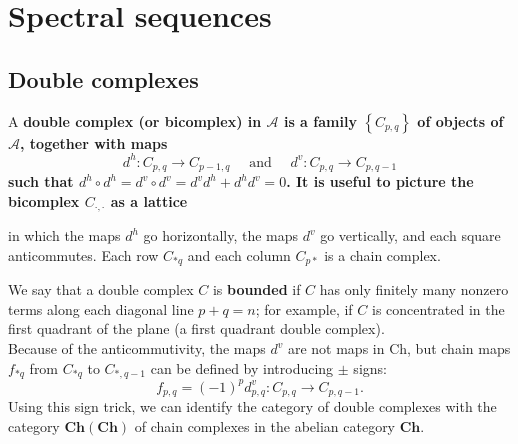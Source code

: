 \section{Spectral sequences}

\subsection{Double complexes}
A \bf{double complex} (or bicomplex) in $\mathcal{A}$ is a family $\left\{C_{p, q}\right\}$ of objects of $\mathcal{A}$, together with maps
$$
d^h: C_{p, q} \rightarrow C_{p-1, q} \quad \text { and } \quad d^v: C_{p, q} \rightarrow C_{p, q-1}
$$
such that $d^h \circ d^h=d^v \circ d^v=d^v d^h+d^h d^v=0$. It is useful to picture the bicomplex $C_{\cdot,\cdot}$ as a lattice 
\begin{center}
\end{center}
    in which the maps $d^h$ go horizontally, the maps $d^v$ go vertically, and each square anticommutes. Each row $C_{* q}$ and each column $C_{p *}$ is a chain complex.

We say that a double complex $C$ is \textbf{bounded} if $C$ has only finitely many nonzero terms along each diagonal line $p+q=n$; for example, if $C$ is concentrated in the first quadrant of the plane (a first quadrant double complex).\\
Because of the anticommutivity, the maps $d^v$ are not maps in Ch, but chain maps $f_{* q}$ from $C_{* q}$ to $C_{*, q-1}$ can be defined by introducing $\pm$ signs:
$$
f_{p, q}=(-1)^p d_{p, q}^v: C_{p, q} \rightarrow C_{p, q-1} .
$$
Using this sign trick, we can identify the category of double complexes with the category $\mathbf{C h}(\mathbf{C h})$ of chain complexes in the abelian category $\mathbf{C h}$.


